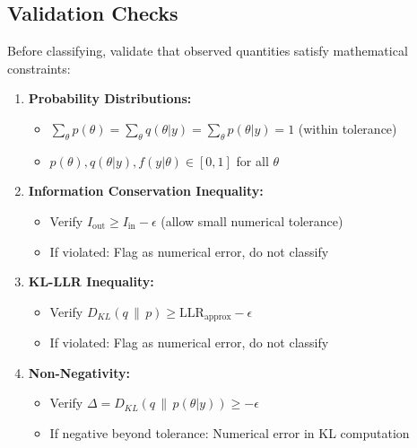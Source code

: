 \documentclass{article}
\theoremstyle{definition}
\begin{document}
\subsection{Validation Checks}

Before classifying, validate that observed quantities satisfy mathematical constraints:
\begin{enumerate}
    \item \textbf{Probability Distributions:}
    \begin{itemize}
        \item $\sum_{\theta} p(\theta) = \sum_{\theta} q(\theta|y) = \sum_{\theta} p(\theta|y) = 1$ (within tolerance)
        \item $p(\theta), q(\theta|y), f(y|\theta) \in [0, 1]$ for all $\theta$
    \end{itemize}

    \item \textbf{Information Conservation Inequality:}
    \begin{itemize}
        \item Verify $I_{\text{out}} \geq I_{\text{in}} - \epsilon$ (allow small numerical tolerance)
        \item If violated: Flag as numerical error, do not classify
    \end{itemize}

    \item \textbf{KL-LLR Inequality:}
    \begin{itemize}
        \item Verify $D_{KL}(q \,\|\, p) \geq \text{LLR}_{\text{approx}} - \epsilon$
        \item If violated: Flag as numerical error, do not classify
    \end{itemize}

    \item \textbf{Non-Negativity:}
    \begin{itemize}
        \item Verify $\Delta = D_{KL}(q \,\|\, p(\theta|y)) \geq -\epsilon$
        \item If negative beyond tolerance: Numerical error in KL computation
    \end{itemize}
\end{enumerate}
\end{document}
